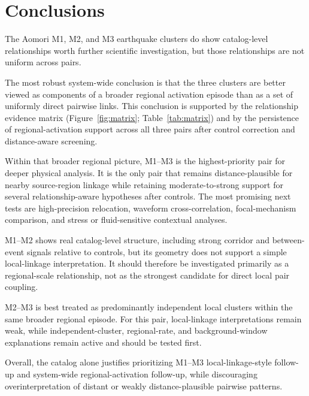 \documentclass[11pt]{article}
\begin{document}
\section{Conclusions}
The Aomori M1, M2, and M3 earthquake clusters do show catalog-level relationships worth further scientific investigation, but those relationships are not uniform across pairs.

The most robust system-wide conclusion is that the three clusters are better viewed as components of a broader regional activation episode than as a set of uniformly direct pairwise links. This conclusion is supported by the relationship evidence matrix (Figure~\ref{fig:matrix}; Table~\ref{tab:matrix}) and by the persistence of regional-activation support across all three pairs after control correction and distance-aware screening.

Within that broader regional picture, M1--M3 is the highest-priority pair for deeper physical analysis. It is the only pair that remains distance-plausible for nearby source-region linkage while retaining moderate-to-strong support for several relationship-aware hypotheses after controls. The most promising next tests are high-precision relocation, waveform cross-correlation, focal-mechanism comparison, and stress or fluid-sensitive contextual analyses.

M1--M2 shows real catalog-level structure, including strong corridor and between-event signals relative to controls, but its geometry does not support a simple local-linkage interpretation. It should therefore be investigated primarily as a regional-scale relationship, not as the strongest candidate for direct local pair coupling.

M2--M3 is best treated as predominantly independent local clusters within the same broader regional episode. For this pair, local-linkage interpretations remain weak, while independent-cluster, regional-rate, and background-window explanations remain active and should be tested first.

Overall, the catalog alone justifies prioritizing M1--M3 local-linkage-style follow-up and system-wide regional-activation follow-up, while discouraging overinterpretation of distant or weakly distance-plausible pairwise patterns.
\end{document}
